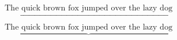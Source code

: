 \documentclass{article}
\begin{document}
$\underbracket{\textrm{The quick brown fox jumped over the lazy dog}}$ \par

$\underbrace{\textrm{The quick brown fox jumped over the lazy dog}}$ \par
\end{document}
